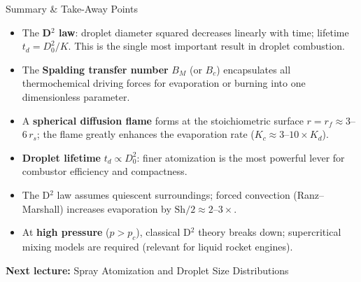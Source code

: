 \documentclass[12pt,aspectratio=169]{beamer}
\begin{document}
\begin{frame}{Summary \& Take-Away Points}
  \begin{itemize}
    \item The \textbf{D$^2$ law}: droplet diameter squared decreases
          linearly with time; lifetime $t_d = D_0^2/K$.
          This is the single most important result in droplet combustion.
    \item The \textbf{Spalding transfer number} $B_M$ (or $B_c$)
          encapsulates all thermochemical driving forces for
          evaporation or burning into one dimensionless parameter.
    \item A \textbf{spherical diffusion flame} forms at the
          stoichiometric surface $r = r_f \approx 3$--$6\,r_s$;
          the flame greatly enhances the evaporation rate
          ($K_c \approx 3$--$10 \times K_d$).
    \item \textbf{Droplet lifetime} $t_d \propto D_0^2$: finer
          atomization is the most powerful lever for combustor
          efficiency and compactness.
    \item The D$^2$ law assumes quiescent surroundings; forced
          convection (Ranz--Marshall) increases evaporation by
          $\mathrm{Sh}/2 \approx 2$--$3\times$.
    \item At \textbf{high pressure} ($p > p_c$), classical D$^2$
          theory breaks down; supercritical mixing models are required
          (relevant for liquid rocket engines).
  \end{itemize}
  \vfill
  \begin{center}
    \large\textbf{Next lecture:} Spray Atomization and Droplet Size
    Distributions
  \end{center}
\end{frame}
\end{document}

